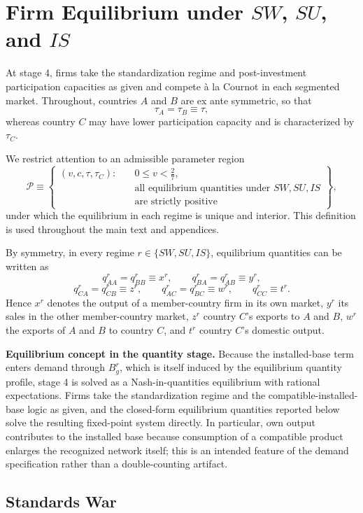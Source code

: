 \section{Firm Equilibrium under \texorpdfstring{$SW$}{SW}, \texorpdfstring{$SU$}{SU}, and \texorpdfstring{$IS$}{IS}}

At stage 4, firms take the standardization regime and post-investment participation capacities as given and compete \`a la Cournot in each segmented market. Throughout, countries $A$ and $B$ are ex ante symmetric, so that
\[
\tau_A=\tau_B\equiv \tau,
\]
whereas country $C$ may have lower participation capacity and is characterized by $\tau_C$.

We restrict attention to an admissible parameter region
\[
\mathcal P
\equiv
\left\{
\begin{aligned}
(v,c,\tau,\tau_C):\quad &0\le v<\frac{2}{7},\\
&\text{all equilibrium quantities under } SW,SU,IS\\
&\text{are strictly positive}
\end{aligned}
\right\},
\]
under which the equilibrium in each regime is unique and interior. This
definition is used throughout the main text and appendices.

By symmetry, in every regime $r\in\{SW,SU,IS\}$, equilibrium quantities can be written as
\[
q_{AA}^r=q_{BB}^r\equiv x^r,\qquad
q_{BA}^r=q_{AB}^r\equiv y^r,
\]
\[
q_{CA}^r=q_{CB}^r\equiv z^r,\qquad
q_{AC}^r=q_{BC}^r\equiv w^r,\qquad
q_{CC}^r\equiv t^r.
\]
Hence $x^r$ denotes the output of a member-country firm in its own market, $y^r$ its sales in the other member-country market, $z^r$ country $C$'s exports to $A$ and $B$, $w^r$ the exports of $A$ and $B$ to country $C$, and $t^r$ country $C$'s domestic output.

\noindent\textbf{Equilibrium concept in the quantity stage.}
Because the installed-base term enters demand through $B_g^r$, which is itself
induced by the equilibrium quantity profile, stage 4 is solved as a
Nash-in-quantities equilibrium with rational expectations. Firms take the
standardization regime and the compatible-installed-base logic as given, and
the closed-form equilibrium quantities reported below solve the resulting
fixed-point system directly. In particular, own output contributes to the
installed base because consumption of a compatible product enlarges the
recognized network itself; this is an intended feature of the demand
specification rather than a double-counting artifact.

\subsection{Standards War}


